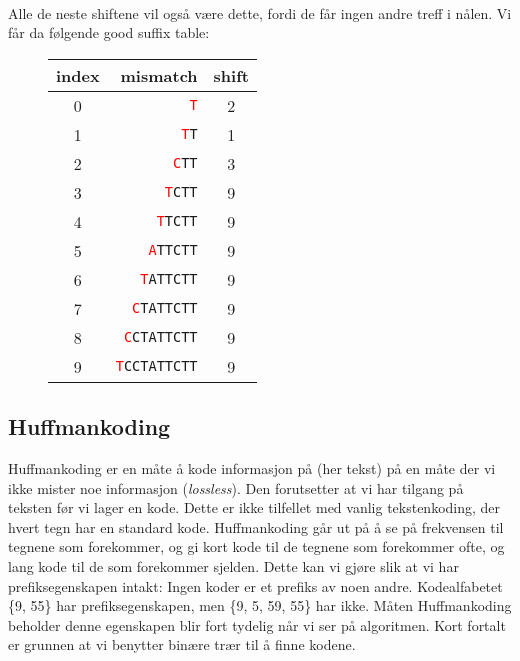 \begin{eks}
~\\Alle de neste shiftene vil også være dette, fordi de får ingen andre treff i nålen. Vi får da følgende good suffix table:
\begin{figure}[H]
\centering
\begin{tabular}{crc}
index&mismatch&shift\\
\hline
0&\texttt{\textcolor{red}{T}}&2\\
1&\texttt{\textcolor{red}{T}T}&1\\
2&\texttt{\textcolor{red}{C}TT}&3\\
3&\texttt{\textcolor{red}{T}CTT}&9\\
4&\texttt{\textcolor{red}{T}TCTT}&9\\
5&\texttt{\textcolor{red}{A}TTCTT}&9\\
6&\texttt{\textcolor{red}{T}ATTCTT}&9\\
7&\texttt{\textcolor{red}{C}TATTCTT}&9\\
8&\texttt{\textcolor{red}{C}CTATTCTT}&9\\
9&\texttt{\textcolor{red}{T}CCTATTCTT}&9\\
\end{tabular}
\end{figure}
\end{eks}

	\subsection{Huffmankoding}\label{huffman}
		Huffmankoding er en måte å kode informasjon på (her tekst) på en måte der vi ikke mister noe informasjon (\textit{lossless}). Den forutsetter at vi har tilgang på teksten før vi lager en kode. Dette er ikke tilfellet med vanlig tekstenkoding, der hvert tegn har en standard kode. Huffmankoding går ut på å se på frekvensen til tegnene som forekommer, og gi kort kode til de tegnene som forekommer ofte, og lang kode til de som forekommer sjelden. Dette kan vi gjøre slik at vi har prefiksegenskapen intakt: Ingen koder er et prefiks av noen andre. Kodealfabetet \{9, 55\} har prefiksegenskapen, men \{9, 5, 59, 55\} har ikke. Måten Huffmankoding beholder denne egenskapen blir fort tydelig når vi ser på algoritmen. Kort fortalt er grunnen at vi benytter binære trær til å finne kodene.
		
